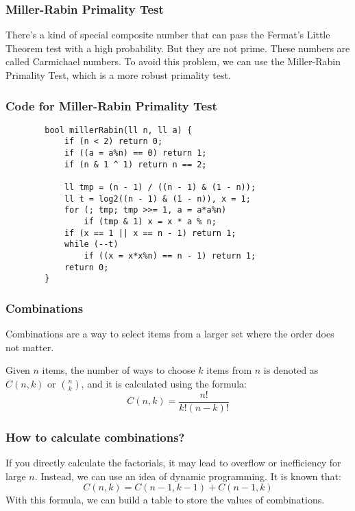 \documentclass[xcolor=dvipsnames]{beamer}
\begin{document}
    \begin{frame}
        \frametitle{Miller-Rabin Primality Test}
        There's a kind of special composite number that can pass the Fermat's Little Theorem test with a high probability. But they are not prime. These numbers are called Carmichael numbers. To avoid this problem, we can use the Miller-Rabin Primality Test, which is a more robust primality test.

    \end{frame}

    \begin{frame}[fragile]
        \frametitle{Code for Miller-Rabin Primality Test}

        \begin{verbatim}
        bool millerRabin(ll n, ll a) {
            if (n < 2) return 0;
            if ((a = a%n) == 0) return 1;
            if (n & 1 ^ 1) return n == 2;
            
            ll tmp = (n - 1) / ((n - 1) & (1 - n));
            ll t = log2((n - 1) & (1 - n)), x = 1;
            for (; tmp; tmp >>= 1, a = a*a%n)
                if (tmp & 1) x = x * a % n;
            if (x == 1 || x == n - 1) return 1;
            while (--t)
                if ((x = x*x%n) == n - 1) return 1;
            return 0;
        }
        \end{verbatim}
    \end{frame}

    \begin{frame}
        \frametitle{Combinations}
        Combinations are a way to select items from a larger set where the order does not matter.

        Given $n$ items, the number of ways to choose $k$ items from $n$ is denoted as $C(n, k)$ or $\binom{n}{k}$, and it is calculated using the formula:
        $$
        C(n, k) = \frac{n!}{k!(n-k)!}
        $$
    \end{frame}

    \begin{frame}
        \frametitle{How to calculate combinations?}
        If you directly calculate the factorials, it may lead to overflow or inefficiency for large $n$. Instead, we can use an idea of dynamic programming. It is known that:
        $$
        C(n, k) = C(n-1, k-1) + C(n-1, k)
        $$
        With this formula, we can build a table to store the values of combinations.
    \end{frame}
\end{document}
